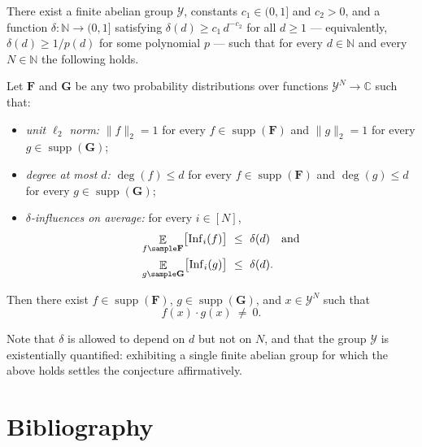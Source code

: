 \documentclass{conjura-conjecture}
\newcommand{\NN}{\mathbb{N}}
\newcommand{\CC}{\mathbb{C}}
\newcommand{\cY}{\mathcal{Y}}
\newcommand{\bF}{\mathbf{F}}
\newcommand{\bG}{\mathbf{G}}
\begin{document}
\begin{conjecture}\label{conj:main}
There exist a finite abelian group $\cY$, constants $c_1\in(0,1]$ and
$c_2>0$, and a function $\delta\colon\NN\to(0,1]$ satisfying
$\delta(d)\ge c_1\,d^{-c_2}$ for all $d\ge 1$ --- equivalently,
$\delta(d)\ge 1/p(d)$ for some polynomial $p$ --- such that for every
$d\in\NN$ and every $N\in\NN$ the following holds.

Let $\bF$ and $\bG$ be any two probability distributions over functions
$\cY^N\to\CC$ such that:
\begin{itemize}
  \item \emph{unit $\ell_2$ norm:} $\lVert f\rVert_2 = 1$ for every
  $f\in\operatorname{supp}(\bF)$ and $\lVert g\rVert_2 = 1$ for every
  $g\in\operatorname{supp}(\bG)$;
  \item \emph{degree at most $d$:} $\deg(f)\le d$ for every
  $f\in\operatorname{supp}(\bF)$ and $\deg(g)\le d$ for every
  $g\in\operatorname{supp}(\bG)$;
  \item \emph{$\delta$-influences on average:} for every $i\in[N]$,
  \[
    \begin{aligned}
      \mathop{\mathbb{E}}_{f\sample\bF}
        \bigl[\operatorname{Inf}_i(f)\bigr]
        &\ \le\ \delta(d) \quad\text{and} \\
      \mathop{\mathbb{E}}_{g\sample\bG}
        \bigl[\operatorname{Inf}_i(g)\bigr]
        &\ \le\ \delta(d).
    \end{aligned}
  \]
\end{itemize}
Then there exist $f\in\operatorname{supp}(\bF)$,
$g\in\operatorname{supp}(\bG)$, and $x\in\cY^N$ such that
\[ f(x)\cdot g(x)\ \ne\ 0. \]
\end{conjecture}

\begin{remark}
\label{rem:quant}
Note that $\delta$ is allowed to depend on $d$ but not on $N$, and that
the group $\cY$ is existentially quantified: exhibiting a single finite
abelian group for which the above holds settles the conjecture
affirmatively.
\end{remark}

\section{Bibliography}
\end{document}
